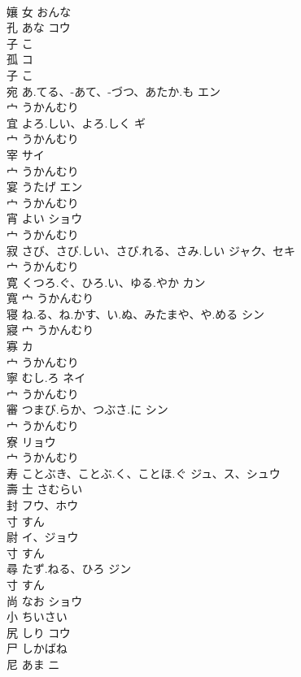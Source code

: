 \documentclass[8pt]{extreport}
\begin{document}
\begin{CJK}{UTF8}{min}
\\	孃	女		おんな		
\\	孔	あな	コウ	
\\	子		こ		
\\	孤		コ	
\\	子		こ		
\\	宛	あ.てる、-あて、-づつ、あたか.も	エン	
\\	宀		うかんむり		
\\	宜	よろ.しい、よろ.しく	ギ	
\\	宀		うかんむり		
\\	宰		サイ	
\\	宀		うかんむり		
\\	宴	うたげ	エン	
\\	宀		うかんむり		
\\	宵	よい	ショウ	
\\	宀		うかんむり		
\\	寂	さび、さび.しい、さび.れる、さみ.しい	ジャク、セキ	
\\	宀		うかんむり		
\\	寛	くつろ.ぐ、ひろ.い、ゆる.やか	カン	
\\	寬	宀		うかんむり		
\\	寝	ね.る、ね.かす、い.ぬ、みたまや、や.める	シン	
\\	寢	宀		うかんむり		
\\	寡		カ	
\\	宀		うかんむり		
\\	寧	むし.ろ	ネイ	
\\	宀		うかんむり		
\\	審	つまび.らか、つぶさ.に	シン	
\\	宀		うかんむり		
\\	寮		リョウ	
\\	宀		うかんむり		
\\	寿	ことぶき、ことぶ.く、ことほ.ぐ	ジュ、ス、シュウ	
\\	壽	士		さむらい		
\\	封		フウ、ホウ	
\\	寸		すん		
\\	尉		イ、ジョウ	
\\	寸		すん		
\\	尋	たず.ねる、ひろ	ジン	
\\	寸		すん		
\\	尚	なお	ショウ	
\\	小		ちいさい		
\\	尻	しり	コウ	
\\	尸		しかばね		
\\	尼	あま	ニ	

\end{CJK}
\end{document}

